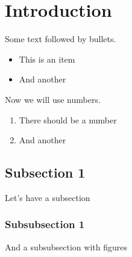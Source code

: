\section{Introduction}
Some text followed by bullets.
\begin{itemize}
\item This is an item
\item And another
\end{itemize}
Now we will use numbers.
\begin{enumerate}
\item There should be a number
\item And another
\end{enumerate}
\subsection{Subsection 1}
Let's have a subsection
\subsubsection{Subsubsection 1}
And a subsubsection with figures
\begin{comment}
\begin{figure}[H]
  \texttt{[image: illustrations/UseCase\_ver1.png]}
  \caption{Usecase version 1.1}
  \label{dailyscrum}
\end{figure}
\begin{figure}[H]
  \texttt{[image: illustrations/UseCase\_ver2.png]}
  \caption{Usecase version 2.0}
  \label{burndown}
\end{figure}
\end{comment}
